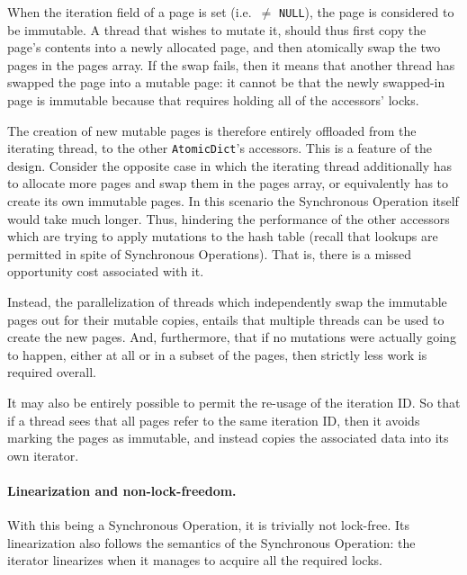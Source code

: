 When the iteration field of a page is set (i.e.\ $\neq$ \texttt{NULL}), the page is considered to be immutable.
A thread that wishes to mutate it, should thus first copy the page's contents into a newly allocated page, and then atomically swap the two pages in the pages array.
If the swap fails, then it means that another thread has swapped the page into a mutable page: it cannot be that the newly swapped-in page is immutable because that requires holding all of the accessors' locks.

The creation of new mutable pages is therefore entirely offloaded from the iterating thread, to the other \texttt{AtomicDict}'s accessors.
This is a feature of the design.
Consider the opposite case in which the iterating thread additionally has to allocate more pages and swap them in the pages array, or equivalently has to create its own immutable pages.
In this scenario the Synchronous Operation itself would take much longer.
Thus, hindering the performance of the other accessors which are trying to apply mutations to the hash table (recall that lookups are permitted in spite of Synchronous Operations).
That is, there is a missed opportunity cost associated with it.

Instead, the parallelization of threads which independently swap the immutable pages out for their mutable copies, entails that multiple threads can be used to create the new pages.
And, furthermore, that if no mutations were actually going to happen, either at all or in a subset of the pages, then strictly less work is required overall.

It may also be entirely possible to permit the re-usage of the iteration ID\@.
So that if a thread sees that all pages refer to the same iteration ID, then it avoids marking the pages as immutable, and instead copies the associated data into its own iterator.


\paragraph{Linearization and non-lock-freedom.}
With this being a Synchronous Operation, it is trivially not lock-free.
Its linearization also follows the semantics of the Synchronous Operation: the iterator linearizes when it manages to acquire all the required locks.
